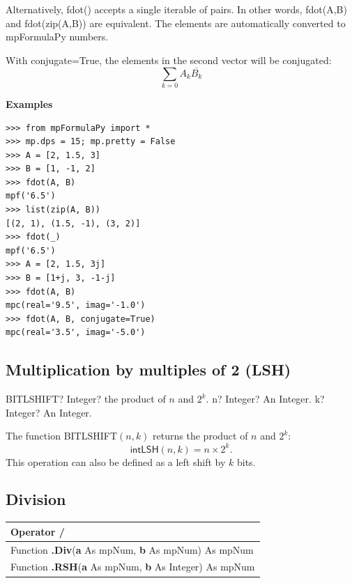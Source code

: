 Alternatively, fdot() accepts a single iterable of pairs. In other words, fdot(A,B) and fdot(zip(A,B)) are equivalent. The elements are automatically converted to mpFormulaPy numbers.

\vpara
With conjugate=True, the elements in the second vector will be conjugated:
\begin{equation}
	\sum_{k=0} A_k \overline{B_k}
\end{equation}

\vpara
\textbf{Examples}

\begin{lstlisting}
>>> from mpFormulaPy import *
>>> mp.dps = 15; mp.pretty = False
>>> A = [2, 1.5, 3]
>>> B = [1, -1, 2]
>>> fdot(A, B)
mpf('6.5')
>>> list(zip(A, B))
[(2, 1), (1.5, -1), (3, 2)]
>>> fdot(_)
mpf('6.5')
>>> A = [2, 1.5, 3j]
>>> B = [1+j, 3, -1-j]
>>> fdot(A, B)
mpc(real='9.5', imag='-1.0')
>>> fdot(A, B, conjugate=True)
mpc(real='3.5', imag='-5.0')
\end{lstlisting}




\subsection{Multiplication by multiples of 2 (LSH)}

\vspace{0.6cm}
\begin{mpFunctionsExtract}
	\mpWorksheetFunctionTwoNotImplemented
	{BITLSHIFT? Integer? the product of $n$ and $2^k$.}
	{n? Integer? An Integer.}
	{k? Integer? An Integer.}
\end{mpFunctionsExtract}

\vspace{0.3cm}
The function \textsf{BITLSHIFT$(n, k)$} returns the product of $n$ and $2^k$: 
\begin{equation}
	\textsf{intLSH}(n, k) =n \times 2^k.
\end{equation}
This operation can also be defined as a left shift by $k$ bits.






\subsection{Division }
\begin{tabular}{p{481pt}}
	\toprule
	\textsf{Operator \textbf{/}}\index{Multiprecision Functions!/} \\
	\midrule
	\textsf{Function \textbf{.Div}(\textbf{a} As mpNum, \textbf{b} As mpNum) As mpNum}\index{Multiprecision Functions!.Div} \\
	\textsf{Function \textbf{.RSH}(\textbf{a} As mpNum, \textbf{b} As Integer) As mpNum}\index{Multiprecision Functions!.RSH} \\
	\bottomrule
\end{tabular}

